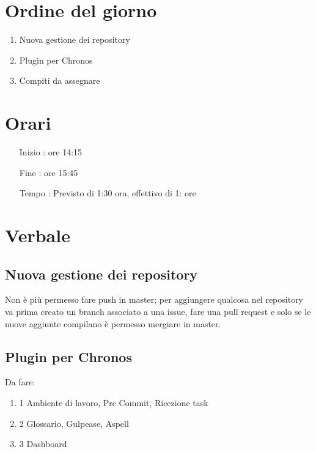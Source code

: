 \documentclass[11pt]{meetingmins}
\begin{document}
\maketitle

\section{Ordine del giorno}

\begin{enumerate}

  \item Nuova gestione dei repository
  \item Plugin per Chronos
  \item Compiti da assegnare

\end{enumerate}

\section{Orari}

\begin{itemize}
\item[Inizio]: ore 14:15
\item[Fine]: ore 15:45
\item[Tempo]: Previsto di 1:30 ora, effettivo di 1: ore

\end{itemize}

\section{Verbale}

\subsection{Nuova gestione dei repository}
Non è più permesso fare push in master; per aggiungere qualcosa nel repository va prima creato un branch associato a una issue, fare una pull request e solo se le nuove aggiunte compilano è permesso mergiare in master.

\subsection{Plugin per Chronos}

Da fare:

\begin{enumerate}
\item 1 Ambiente di lavoro, Pre Commit, Ricezione task
\item 2 Glossario, Gulpease, Aspell
\item 3 Dashboard
\end{enumerate}
\end{document}

